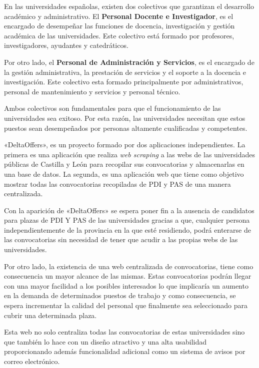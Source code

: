 
En las universidades españolas, existen dos colectivos que garantizan el desarrollo académico y administrativo. El \textbf{Personal Docente e Investigador}, es el encargado de desempeñar las funciones de docencia, investigación y gestión académica de las universidades. Este colectivo está formado por profesores, investigadores, ayudantes y catedráticos. 

Por otro lado, el \textbf{Personal de Administración y Servicios}, es el encargado de la gestión administrativa, la prestación de servicios y el soporte a la docencia e investigación. Este colectivo esta formado principalmente por administrativos, personal de mantenimiento y servicios y personal técnico.

Ambos colectivos son fundamentales para que el funcionamiento de las universidades sea exitoso. Por esta razón, las universidades necesitan que estos puestos sean desempeñados por personas altamente cualificadas y competentes.

«DeltaOffers», es un proyecto formado por dos aplicaciones independientes. La primera es una aplicación que realiza \textit{web scraping} a las webs de las universidades públicas de Castilla y León para recopilar sus convocatorias y almacenarlas en una base de datos. La segunda, es una aplicación web que tiene como objetivo mostrar todas las convocatorias recopiladas de PDI y PAS de una manera centralizada.

Con la aparición de «DeltaOffers» se espera poner fin a la ausencia de candidatos para plazas de PDI Y PAS de las universidades gracias a que, cualquier persona independientemente de la provincia en la que esté residiendo, podrá enterarse de las convocatorias sin necesidad de tener que acudir a las propias webs de las universidades.

Por otro lado, la existencia de una web centralizada de convocatorias, tiene como consecuencia un mayor alcance de las mismas. Estas convocatorias podrán llegar con una mayor facilidad a los posibles interesados lo que  implicaría un aumento en la demanda de determinados puestos de trabajo y como consecuencia, se espera incrementar la calidad del personal que finalmente sea seleccionado para cubrir una determinada plaza.

Esta web no solo centraliza todas las convocatorias de estas universidades sino que también lo hace con un diseño atractivo y una alta usabilidad proporcionando además funcionalidad adicional como un sistema de avisos por correo electrónico.


